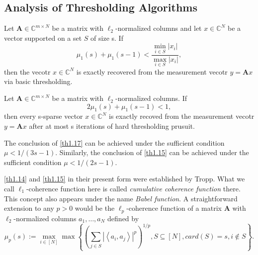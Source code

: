 \subsection{Analysis of Thresholding Algorithms}

\begin{theorem}
    \label{th1.16}
    Let $\mathbf{A} \in \mathbb{C}^{m \times N}$ be a matrix with $\ell_2$-normalized columns and let $x \in \mathbb{C}^N$ be a vector supported on a set $S$ of size s. If 
    \begin{equation}
        \mu_{1}(s) + \mu_1(s-1) < \dfrac{\min_{i\in S}|x_i|}{\max_{i \in S}|x_i|},
        \label{eq1.16}
    \end{equation}
    then the vecotr $x \in \mathbb{C}^N$ is exactly recovered from the measurement vecotr $y = \mathbf{A}x$ via basic thresholding.
\end{theorem}

\begin{theorem}
    \label{th1.17}
    Let $\mathbf{A} \in \mathbb{C}^{m \times N}$ be a matrix with $\ell_2$-normalized columns. If 
    \[
        2\mu_1(s) + \mu_1(s-1) < 1,
    \]
    then every s-sparse vector $x \in \mathbb{C}^N$ is exactly recoved from the measurement vecotr $y = \mathbf{A}x$ after at most s iterations of hard thresholding prusuit.
\end{theorem}
\begin{note}
    The conclusion of \cref{th1.17} can be achieved under the sufficient condition $\mu < 1/(3s-1)$. Similarly, the conclusion of \cref{th1.15} can be achieved under the sufficient condition $\mu < 1/(2s-1)$. 

    \cref{th1.14} and \cref{th1.15} in their present form were established by Tropp. What we call $\ell_1$-coherence function here is called \emph{\textcolor[rgb]{1,0,0}{cumulative coherence function}} there. This concept also appears under the name \emph{\textcolor[rgb]{1,0,0}{Babel function}}. A straightforward extension to any $p>0$ would be the $\ell_p$-coherence function of a matrix $\mathbf{A}$ with $\ell_2$-normalized columns $a_1,\dots,a_N$ defined by
    \[
        \mu_p(s) := \max\limits_{i \in [N]} \max \left\{ \left( \sum\limits_{j \in S}\left|\left<a_i, a_j\right>\right|^p \right)^{1/p}, S \subseteq [N], card(S) = s, i \notin S \right\}.
    \]
\end{note}

